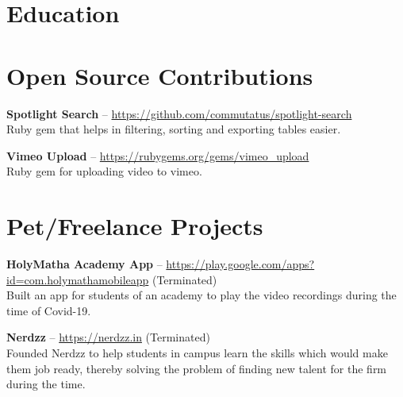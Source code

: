 \documentclass[11pt,a4paper]{moderncv}
\begin{document}


\vspace{10pt}
\section{Education}





\vspace{10pt}
\section{Open Source Contributions}

\cvlistitem
{\textbf{Spotlight Search} -- {\small \href{https://github.com/commutatus/spotlight-search}{https://github.com/commutatus/spotlight-search}}
  \\Ruby gem that helps in filtering, sorting and exporting tables easier.
}

\vspace{5pt}

\cvlistitem
{\textbf{Vimeo Upload} -- {\small \href{https://rubygems.org/gems/vimeo\_upload}{https://rubygems.org/gems/vimeo\_upload}}
  \\Ruby gem for uploading video to vimeo.
}




\vspace{10pt}
\section{Pet/Freelance Projects}

\cvlistitem
{\textbf{HolyMatha Academy App} -- {\small \href{https://play.google.com/store/apps/details?id=com.holymathamobileapp}{https://play.google.com/apps?id=com.holymathamobileapp}} (Terminated)
  \\Built an app for students of an academy to play the video recordings during the time of Covid-19.
}

\vspace{5pt}

\cvlistitem
{\textbf{Nerdzz} -- {\small \href{https://nerdzz.in}{https://nerdzz.in}} (Terminated)
  \\Founded Nerdzz to help students in campus learn the skills which would make them job ready, thereby solving the problem of finding new talent for the firm during the time.
}
\end{document}
